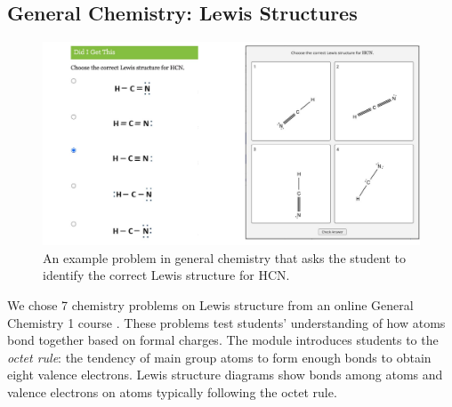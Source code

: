 \subsection{General Chemistry: Lewis Structures}
\label{sec:chemistry}

\begin{figure}[h!]
    \centering
    \includegraphics[width=\linewidth]{assets/edgeworth/chemistry-problem.pdf}
    \caption{An example problem in general chemistry that asks the student to identify the correct Lewis structure for HCN.}
    \label{fig:chem-problem}
\end{figure}

We chose 7 chemistry problems on Lewis structure from an online General Chemistry 1 course \cite{oli}. These problems test students' understanding of how atoms bond together based on formal charges. The module introduces students to the \textit{octet rule}: the tendency of main group atoms to form enough bonds to obtain eight valence electrons. Lewis structure diagrams show bonds among atoms and valence electrons on atoms typically following the octet rule. 



